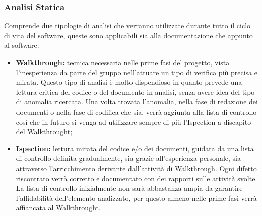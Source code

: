 		\subsubsection{Analisi Statica}
		Comprende due tipologie di analisi che verranno utilizzate durante tutto il ciclo di vita del software, queste sono applicabili sia alla documentazione che appunto al software:
			\begin{itemize}
				\item \textbf{Walkthrough:} tecnica necessaria nelle prime fasi del progetto, vista l'inesperienza da parte del gruppo nell'attuare un tipo di verifica più precisa e mirata. Questo tipo di analisi è molto dispendioso in quanto prevede una lettura critica del codice o del documento in analisi, senza avere idea del tipo di anomalia ricercata. Una volta trovata l'anomalia, nella fase di redazione dei documenti o nella fase di codifica che sia, verrà aggiunta alla lista di controllo così che in futuro si venga ad utilizzare sempre di più l'Ispection a discapito del Walkthrought;
				\item \textbf{Ispection:} lettura mirata del codice e/o dei documenti, guidata da una
lista di controllo definita gradualmente, sia grazie all'esperienza personale, sia attraverso l'arricchimento derivante dall'attività di Walkthrough. Ogni difetto riscontrato verrà corretto e documentato con dei rapporti sulle attività svolte. La lista di controllo inizialmente non sarà abbastanza ampia da garantire l'affidabilità dell'elemento analizzato, per questo almeno nelle prime fasi verrà affiancata al Walkthrought.
			\end{itemize}
